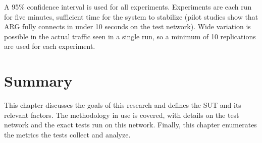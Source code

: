 \par A 95\% confidence interval is used for all experiments. Experiments are each run for five minutes, sufficient time for the system to stabilize (pilot studies show that \ac{ARG} fully connects in under 10 seconds on the test network). Wide variation is possible in the actual traffic seen in a single run, so a minimum of 10 replications are used for each experiment.

\section{Summary}
\label{sec:method_summary}
\par This chapter discusses the goals of this research and defines the \ac{SUT} and its relevant factors. The methodology in use is covered, with details on the test network and the exact tests run on this network. Finally, this chapter enumerates the metrics the tests collect and analyze. 

